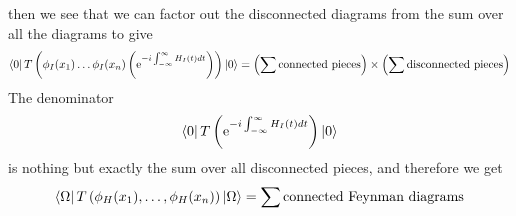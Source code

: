 \documentclass[11pt]{article}
\newcommand{\e}{\mathrm{e}}
\numberwithin{equation}{section}
\begin{document}
then we see that we can factor out the disconnected diagrams from the sum over all the diagrams to give 
\begin{equation*}
    \bra{0}T\left( \phi_I(x_1)\ldots\phi_I(x_n) \left(\e^{-i\int_{-\infty}^{\infty}H_I(t) dt }\right) \right) \ket{0} = \left( \sum \text{connected pieces}  \right) \times \left( \sum \text{disconnected pieces}  \right)
\end{equation*}
The denominator 
\begin{equation*}
    \bra{0}T\left( \e^{-i\int_{-\infty}^{\infty}H_I(t) dt }\right) \ket{0}
\end{equation*}
is nothing but exactly the sum over all disconnected pieces, and therefore we get 
\begin{equation*}
    \bra{\Omega} T\left( \phi_H(x_1),\ldots,\phi_H(x_n)  \right) \ket{\Omega} = \sum \text{connected Feynman diagrams} 
\end{equation*}
\end{document}
